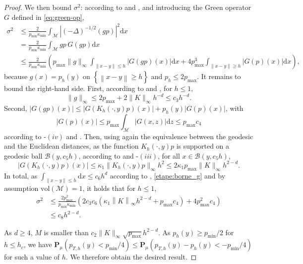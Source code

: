 \documentclass[10pt,a4paper]{article}
\renewcommand{\P}{{\mathbf P}}
\newcommand{\vol}{ \mathrm{vol}}
\newcommand\cB{\mathcal{B}}
\newcommand\cM{\mathcal{M}}
\newcommand\dd{\mathrm{d}}
\newcommand{\BRA}[1]{{{\left\{#1\right\}}}} %
\newcommand{\NRM}[1]{{{\left\| #1\right\|}}} %
\newcommand{\PAR}[1]{{{\left(#1\right)}}} %
\begin{document}
\begin{proof}
We then bound $\sigma^2$: according to  and ,  and introducing the Green operator $G$ defined in \eqref{eq:green-op},
    \begin{align*}
        \sigma^2&\le \frac{2}{p_{\min}\kappa_{\min}} \int_\cM |(-\Delta)^{-1/2}(gp)|^2\dd x\\
        &= \frac{2}{p_{\min}\kappa_{\min}} \int_\cM gp \,G(gp)\dd x\\
        &\le  \frac{2 }{p_{\min}\kappa_{\min}} \PAR{p_{\max}\|g\|_\infty\int_{\|x-y\|\le  h} |G(gp)(x)|\dd x+ 4p_{\max}^3\int_{\|x-y\|\ge  h} |G(p)(x)|\dd x},
    \end{align*}
    because $g(x)=p_h(y)$ on $\BRA{\NRM{x-y}\ge h}$ and $p_h\le 2p_{\max}$.
    It remains to bound the right-hand side. First, according to  and , for $h\le 1$,
    \begin{equation}\label{etape:borne_g}\|g\|_\infty \le 2p_{\max}+ 2\|K\|_\infty h^{-d}\le c_3 h^{-d}.
    \end{equation}
    Second, $|G(gp)(x)|\le |G(K_h(\cdot,y)p)(x)|+ p_h(y)|G(p)(x)|$, with
    \[ |G(p)(x)|\le p_{\max}\int_\cM |G(x,z)|\dd z\le p_{\max}c_4 \]
    according to -$(iv)$ and . Then, using again the equivalence between the geodesic and the Euclidean distances, as the function $K_h(\cdot,y)p$ is supported on a geodesic ball $\cB(y,c_5 h)$, according to  and -$(iii)$, for all $x\in \cB(y,c_5 h)$, 
    \[ |G(K_h(\cdot,y)p)(x)|\le \kappa_1\|K_h(\cdot,y)p\|_\infty h^2 \le 2\kappa_1p_{\max}\|K\|_\infty h^{2-d}.\]
    In total, as $\int_{\|x-y\|\le  h} \dd x\le c_6h^d$ according to , \eqref{etape:borne_g} and by assumption $\vol(\cM)=1$, it holds that  for $h\le 1$,
    \begin{align*}
    \sigma^2&\le \frac{2 p_{\max}^2}{p_{\min}\kappa_{\min}} \PAR{2c_3 c_6\PAR{\kappa_1\NRM{K}_\infty h^{2-d}+p_{\max}c_4}+ 4p_{\max}^2c_4}
    \\
    &\le c_8
h^{2-d}.
    \end{align*}

As $d\ge 4$, $M$ is smaller than $c_2\|K\|_\infty \sqrt{p_{\max}}h^{2-d}$. 
As $p_h(y)\ge p_{\min}/2$ for $h\le h_c$, we have $ \P_{\mu}\PAR{ p_{T,h}(y)<p_{\min}/4}\le \P_{\mu}\PAR{ p_{T,h}(y)-p_h(y) <-p_{\min}/4} $ for such a value of $h$. We therefore obtain the desired result.
		\end{proof}
\end{document}
